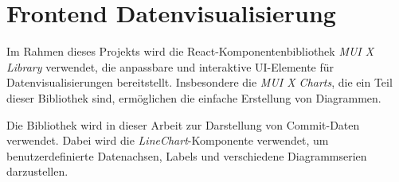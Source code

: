 \section{Frontend Datenvisualisierung}
Im Rahmen dieses Projekts wird die React-Komponentenbibliothek \textit{MUI X Library} verwendet, die anpassbare und interaktive UI-Elemente für Datenvisualisierungen bereitstellt. Insbesondere die \textit{MUI X Charts}, die ein Teil dieser Bibliothek sind, ermöglichen die einfache Erstellung von Diagrammen.

Die Bibliothek wird in dieser Arbeit zur Darstellung von Commit-Daten verwendet. Dabei wird die \textit{LineChart}-Komponente verwendet, um benutzerdefinierte Datenachsen, Labels und verschiedene Diagrammserien darzustellen. \parencite{noauthor_react_nodate}
